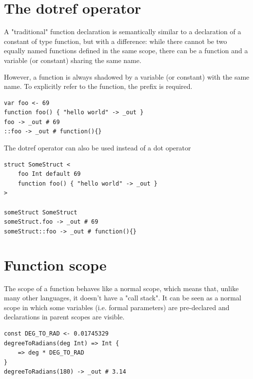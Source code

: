 \section{The dotref operator}

A "traditional" function declaration is semantically similar to a declaration
of a constant of type function, but with a difference: while there cannot be
two equally named functions defined in the same scope, there can be a function
and a variable (or constant) sharing the same name.

However, a function is always shadowed by a variable (or constant) with the
same name. To explicitly refer to the function, the \code{::} prefix is
required.

\begin{verbatim}
var foo <- 69
function foo() { "hello world" -> _out }
foo -> _out # 69
::foo -> _out # function(){}
\end{verbatim}

The dotref operator can also be used instead of a dot operator

\begin{verbatim}
struct SomeStruct <
	foo Int default 69
	function foo() { "hello world" -> _out }
>

someStruct SomeStruct
someStruct.foo -> _out # 69
someStruct::foo -> _out # function(){}
\end{verbatim}

\clearpage

\section{Function scope}

The scope of a function behaves like a normal scope, which means that, unlike
many other languages, it doesn't have a "call stack". It can be seen as a
normal scope in which some variables (i.e. formal parameters) are pre-declared
and declarations in parent scopes are visible.

\begin{verbatim}
const DEG_TO_RAD <- 0.01745329
degreeToRadians(deg Int) => Int {
	=> deg * DEG_TO_RAD
}
degreeToRadians(180) -> _out # 3.14
\end{verbatim}


